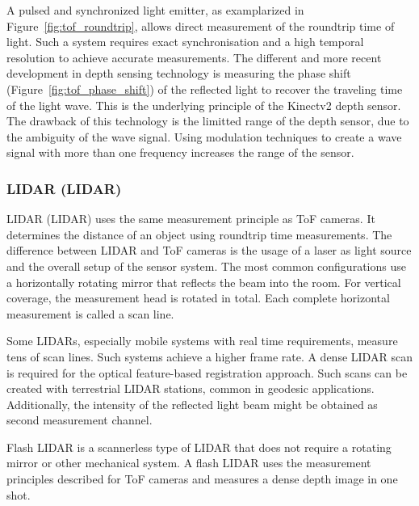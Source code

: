 A pulsed and synchronized light emitter, as examplarized in Figure~\ref{fig:tof_roundtrip}, allows direct measurement of the roundtrip time of light.
Such a system requires exact synchronisation and a high temporal resolution to achieve accurate measurements.
The different and more recent development in depth sensing technology is measuring the phase shift (Figure~\ref{fig:tof_phase_shift}) of the reflected light to recover the traveling time of the light wave.
This is the underlying principle of the Kinectv2 depth sensor\cite{wasenmuller_accv2016}.
The drawback of this technology is the limitted range of the depth sensor, due to the ambiguity of the wave signal.
Using modulation techniques to create a wave signal with more than one frequency increases the range of the sensor\cite[p. 27-41]{hansard_springer2012}.

\subsubsection{\acrlong{LIDAR} (\acrshort{LIDAR})}

\acrlong{LIDAR} (\acrshort{LIDAR}) uses the same measurement principle as \acrshort{ToF} cameras\cite[p. 239]{taylor_crc2019}.
It determines the distance of an object using roundtrip time measurements.
The difference between \acrshort{LIDAR} and \acrshort{ToF} cameras is the usage of a \acrshort{laser} as light source and the overall setup of the sensor system.
The most common configurations use a horizontally rotating mirror that reflects the beam into the room.
For vertical coverage, the measurement head is rotated in total.
Each complete horizontal measurement is called a scan line.

Some \acrshort{LIDAR}s, especially mobile systems with real time requirements, measure tens of scan lines.
Such systems achieve a higher frame rate.
A dense \acrshort{LIDAR} scan is required for the optical feature-based registration approach.
Such scans can be created with terrestrial \acrshort{LIDAR} stations, common in geodesic applications.
Additionally, the intensity of the reflected light beam might be obtained as second measurement channel.

Flash \acrshort{LIDAR} is a scannerless type of \acrshort{LIDAR} that does not require a rotating mirror or other mechanical system\cite{natale_ssiai2010}.
A flash \acrshort{LIDAR} uses the measurement principles described for \acrshort{ToF} cameras and measures a dense depth image in one shot.
